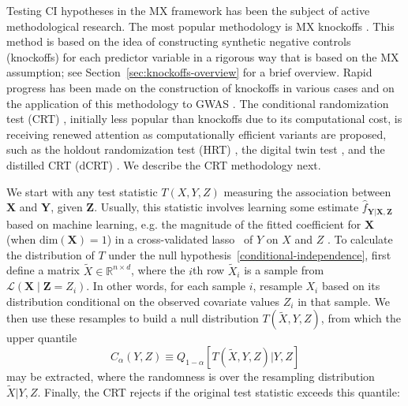 \documentclass[12pt]{article}
\theoremstyle{definition}
\theoremstyle{remark}
\newcommand{\prx}{\bm X}
\newcommand{\srx}{X}
\newcommand{\prz}{\bm Z}
\newcommand{\srz}{Z}
\newcommand{\srxk}{\widetilde X}
\newcommand{\pry}{{\bm Y}}
\newcommand{\sry}{Y}
\begin{document}
Testing CI hypotheses in the MX framework has been the subject of active methodological research. The most popular methodology is MX knockoffs \cite{CetL16}. This method is based on the idea of constructing synthetic negative controls (knockoffs) for each predictor variable in a rigorous way that is based on the MX assumption; see Section~\ref{sec:knockoffs-overview} for a brief overview. Rapid progress has been made on the construction of knockoffs in various cases \cite{SetC17,Romano2019a,Bates2019,Huang2019} and on the application of this methodology to GWAS \cite{SetC17, SetS19}. The conditional randomization test (CRT) \cite{CetL16}, initially less popular than knockoffs due to its computational cost, is receiving renewed attention as computationally efficient variants are proposed, such as the holdout randomization test (HRT) \cite{Tansey2018}, the digital twin test \cite{Bates2020}, and the distilled CRT (dCRT) \cite{Liu2020}. We describe the CRT methodology next.

We start with any test statistic $T(\srx, \sry, \srz)$ measuring the association between $\prx$ and $\pry$, given $\prz$. Usually, this statistic involves learning some estimate $\widehat f_{\pry|\prx,\prz}$ based on machine learning, e.g. the magnitude of the fitted coefficient for $\prx$ (when $\text{dim}(\prx) = 1$) in a cross-validated lasso~\cite{T96} of $\sry$ on $\srx$ and $\srz$ \cite{CetL16}. To calculate the distribution of $T$ under the null hypothesis~\eqref{conditional-independence}, first define a matrix  $\srxk \in \mathbb R^{n \times d}$, where the $i$th row $\srxk_i$ is a sample from $\mathcal L(\prx \mid \prz = \srz_i)$. In other words, for each sample $i$, resample $\srx_i$ based on its distribution conditional on the observed covariate values $Z_i$ in that sample. We then use these resamples to build a null distribution $T(\srxk, \sry, \srz)$, from which the upper quantile
\begin{equation}
	C_{\alpha}(\sry,\srz) \equiv Q_{1-\alpha}[T(\srxk, \sry, \srz)|\sry,\srz]
	\label{upper-quantile}
\end{equation}
may be extracted,
where the randomness is over the resampling distribution $\srxk |  \sry, \srz$. Finally, the CRT rejects if the original test statistic exceeds this quantile:
\end{document}
